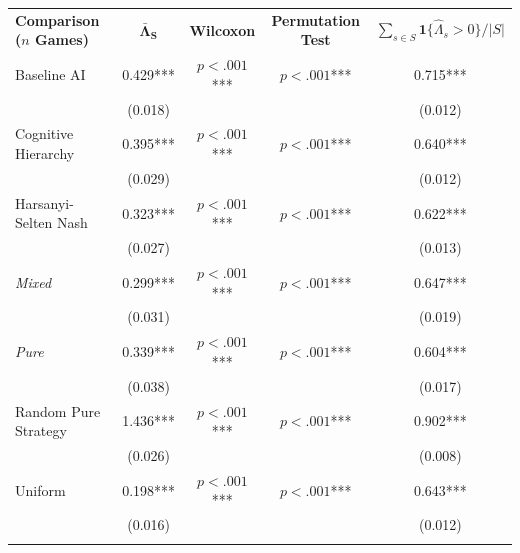 \begin{tabular}{l c c c c}
    \hline \addlinespace[4pt]
    \textbf{Comparison ($n$ Games)} & \multicolumn{1}{c}{\textbf{$\mathbf{\bar{\Lambda}_S}$}} & \multicolumn{1}{c}{\textbf{Wilcoxon}} & \multicolumn{1}{c}{\textbf{Permutation Test}} & \multicolumn{1}{c}{\textbf{$\sum_{s \in S} \mathbf 1\{\hat \Lambda_s > 0\} / |S|$}} \\
\addlinespace[6pt]\hline\addlinespace[6pt]
Baseline AI & \phantom{(}\phantom{....}0.429*** & $p<.001$*** & $p<.001$*** & \phantom{(}\phantom{....}0.715*** \\
 &  (0.018) & & &  (0.012) \\
\addlinespace[2pt]
\addlinespace[6pt]
Cognitive Hierarchy & \phantom{(}\phantom{....}0.395*** & $p<.001$*** & $p<.001$*** & \phantom{(}\phantom{....}0.640*** \\
 &  (0.029) & & &  (0.012) \\
\addlinespace[2pt]
\addlinespace[6pt]
Harsanyi-Selten Nash & \phantom{(}\phantom{....}0.323*** & $p<.001$*** & $p<.001$*** & \phantom{(}\phantom{....}0.622*** \\
 &  (0.027) & & &  (0.013) \\
\addlinespace[2pt]
\quad\quad \textit{Mixed} & \phantom{(}\phantom{....}0.299*** & $p<.001$*** & $p<.001$*** & \phantom{(}\phantom{....}0.647*** \\
 &  (0.031) & & &  (0.019) \\
\addlinespace[2pt]
\quad\quad \textit{Pure} & \phantom{(}\phantom{....}0.339*** & $p<.001$*** & $p<.001$*** & \phantom{(}\phantom{....}0.604*** \\
 &  (0.038) & & &  (0.017) \\
\addlinespace[2pt]
\addlinespace[6pt]
Random Pure Strategy & \phantom{(}\phantom{....}1.436*** & $p<.001$*** & $p<.001$*** & \phantom{(}\phantom{....}0.902*** \\
 &  (0.026) & & &  (0.008) \\
\addlinespace[2pt]
\addlinespace[6pt]
Uniform & \phantom{(}\phantom{....}0.198*** & $p<.001$*** & $p<.001$*** & \phantom{(}\phantom{....}0.643*** \\
 &  (0.016) & & &  (0.012) \\
\addlinespace[2pt]
\hline
\end{tabular}
